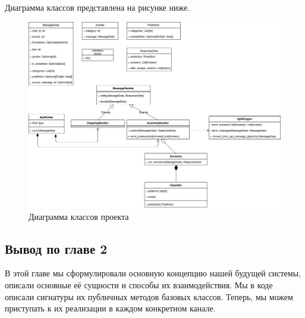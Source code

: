     Диаграмма классов представлена на рисунке ниже.
    \begin{figure}[!h]
        \centering
        \includegraphics[width=\linewidth]{static/ClassDiagram.png}
        \caption{Диаграмма классов проекта}
        \label{fig:class-diagram}
    \end{figure}


    \subsection*{Вывод по главе 2}
    В этой главе мы сформулировали основную концепцию нашей будущей системы, 
    описали основные её сущности и способы их взаимодействия. Мы в коде описали 
    сигнатуры их публичных методов базовых классов.
    Теперь, мы можем приступать к их реализации в каждом конкретном канале.

